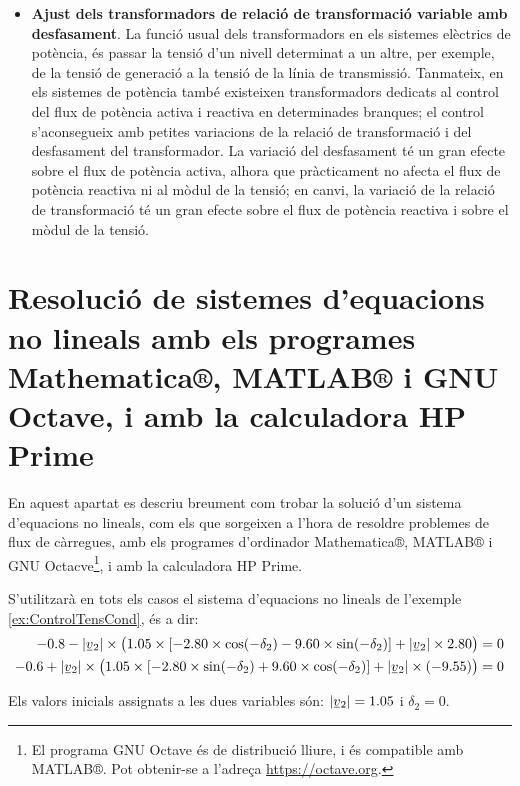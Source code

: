 \begin{itemize}
   \item \textbf{Ajust  dels transformadors de relació de transformació variable amb   desfasament}. La funció usual dels transformadors en els sistemes elèctrics de potència,
    és passar la tensió d'un nivell determinat a un altre, per exemple, de la tensió de generació
    a la tensió de la línia de transmissió. Tanmateix, en els sistemes de potència també existeixen
    transformadors dedicats al control del flux de potència activa i reactiva en determinades
    branques; el control s'aconsegueix amb petites variacions de la relació de transformació i del
    desfasament del transformador. La variació del desfasament té un gran efecte sobre el flux
    de potència activa, alhora que pràcticament no afecta el flux de potència reactiva ni al
    mòdul de la tensió; en canvi, la variació de la relació de transformació té un gran efecte
    sobre el flux de potència reactiva i sobre el mòdul de la tensió.
\end{itemize}

\section{Resolució de sistemes d'equacions no lineals amb els programes Mathematica®, MATLAB® i GNU Octave,  i amb la calculadora \textsf{HP Prime}}
\label{sec:sis_eq_no_lin}


En aquest apartat es descriu breument com trobar la solució d'un sistema d'equacions no lineals, com els que sorgeixen a l'hora de resoldre problemes de flux de càrregues, amb els programes d'ordinador Mathematica®, MATLAB® i GNU Octacve\footnote{El programa GNU Octave és de distribució lliure, i és compatible amb MATLAB®. Pot obtenir-se a l'adreça \href{https://octave.org/}{https://octave.org}.}, i amb la calculadora \textsf{HP Prime}.

S'utilitzarà en tots els casos el sistema d'equacions no lineals de l'exemple \vref{ex:ControlTensCond}, és a dir:
\begin{align*}
\num{-0,8} - |\cmplx{v}_2| \times \bigl( \num{1,05}\times [\num{-2,80}\times \cos(-\delta_2) - \num{9,60} \times
\sin( -\delta_2)]  + |\cmplx{v}_2| \times \num{2,80} \bigr) &= 0 \\
-\num{0,6} + |\cmplx{v}_2| \times\bigl( \num{1,05} \times[\num{-2,80}\times\sin(-\delta_2) +
\num{9,60}\times\cos( -\delta_2)]  + |\cmplx{v}_2|\times (\num{-9,55}) \bigr) &= 0
\end{align*}

Els valors inicials assignats a les dues variables són: $|\cmplx{v}_2|=\num{1,05}$ i $\delta_2=0$.

